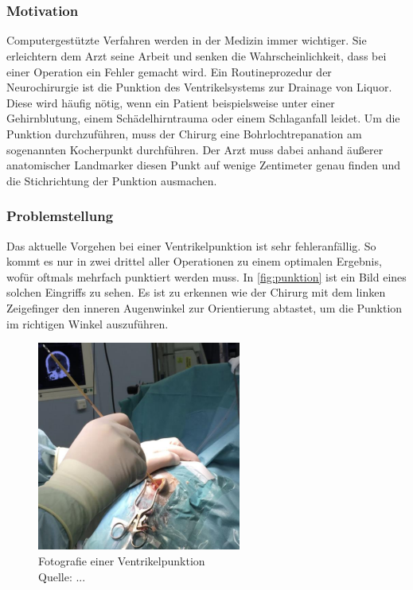 \chapter{}
\label{sec:Introduction}

\subsection{Motivation}

Computergestützte Verfahren werden in der Medizin immer wichtiger. Sie erleichtern dem Arzt seine Arbeit und senken die Wahrscheinlichkeit, dass bei einer Operation ein Fehler gemacht wird.
\newline
Ein Routineprozedur der Neurochirurgie ist die Punktion des Ventrikelsystems zur Drainage von Liquor. Diese wird häufig nötig, wenn ein Patient beispielsweise unter einer Gehirnblutung, einem Schädelhirntrauma oder einem Schlaganfall leidet.
\newline
Um die Punktion durchzuführen, muss der Chirurg eine Bohrlochtrepanation am sogenannten Kocherpunkt durchführen. Der Arzt muss dabei anhand äußerer anatomischer Landmarker diesen Punkt auf wenige Zentimeter genau finden und die Stichrichtung der Punktion ausmachen.



\subsection{Problemstellung}

Das aktuelle Vorgehen bei einer Ventrikelpunktion ist sehr fehleranfällig. So kommt es nur in zwei drittel aller Operationen zu einem optimalen Ergebnis, wofür oftmals mehrfach punktiert werden muss. In \autoref{fig:punktion} ist ein Bild eines solchen Eingriffs zu sehen. Es ist zu erkennen wie der Chirurg mit dem linken Zeigefinger den inneren Augenwinkel zur Orientierung abtastet, um die Punktion im richtigen Winkel auszuführen.


\begin{figure}[!h] 
\centering 
\includegraphics[width=0.6\textwidth]{Logos/Punktion2.png}
\caption{Fotografie einer Ventrikelpunktion  \\Quelle: ...} 
\label{fig:punktion} 
\end{figure}


